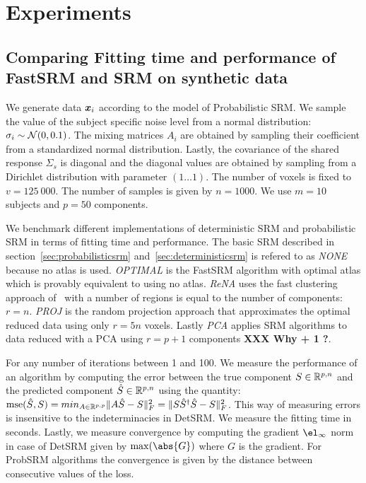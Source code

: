 \section{Experiments}
\subsection{Comparing Fitting time and performance of FastSRM and
  SRM on synthetic data}
We generate data $\boldsymbol{x}_i$ according to the model of Probabilistic SRM. We sample the value of the subject specific noise level from a normal
distribution: $\sigma_i \sim \mathcal{N}(0, 0.1)$. The mixing matrices $A_i$
are obtained by sampling their coefficient from a standardized normal distribution.
Lastly, the covariance of the shared response $\Sigma_s$ is diagonal and the
diagonal values are obtained by sampling from a Dirichlet distribution with
parameter $(1 \dots 1)$.
The number of voxels is fixed to $v=125~000$. The number of samples is given by
$n=1000$. We use $m=10$ subjects and $p=50$ components.

We benchmark different implementations of deterministic SRM and probabilistic
SRM in terms of fitting time and performance. The basic SRM described in
section~\ref{sec:probabilisticsrm} and~\ref{sec:deterministicsrm} is refered to
as \emph{NONE} because no atlas is used. 
\emph{OPTIMAL} is the FastSRM algorithm with optimal atlas which is provably
equivalent to using no atlas. \emph{ReNA} uses the fast clustering approach
of~\cite{hoyos2018recursive} with a number of regions is equal to the number of
components: $r=n$. \emph{PROJ} is the random projection approach that
approximates the optimal reduced data using only $r=5n$ voxels. Lastly
\emph{PCA} applies SRM algorithms to data reduced with a PCA using $r=p+1$ components \textbf{XXX Why  + 1 ?}.

For any number of iterations between 1 and 100.
We measure the performance of an algorithm by computing the error between the true component $S \in \mathbb{R}^{p, n}$ and
the predicted component $\hat{S} \in \mathbb{R}^{p, n}$ using the quantity:
$\mathrm{mse}(\hat{S}, S) = min_{A \in \mathbb{R}^{p, p}} \|A \hat{S} - S \|^2_F =  \|S
\hat{S}^{\dagger}\hat{S} - S \|^2_F$. This way of measuring errors is
insensitive to the indeterminacies in DetSRM.
We measure the fitting time in seconds.
Lastly, we measure convergence by computing the gradient $\el_{\infty}$ norm in
case of DetSRM given by $\max(\abs{G})$ where $G$ is the gradient. For ProbSRM
algorithms the convergence is given by the distance between consecutive values of the loss.

